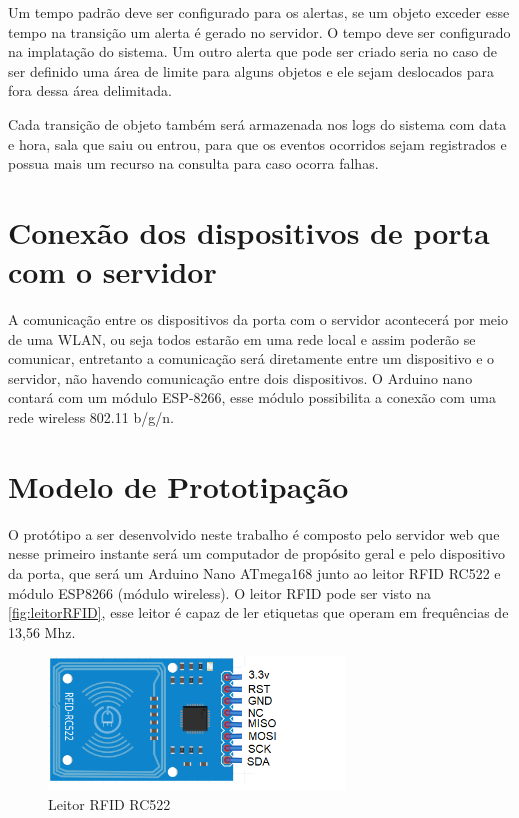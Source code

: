 \par
Um tempo padrão deve ser configurado para os alertas, se um objeto exceder esse tempo na transição um alerta é gerado no servidor. 
O tempo deve ser configurado na implatação do sistema. Um outro alerta que pode ser criado seria no caso de ser definido uma área de limite para alguns objetos e ele sejam deslocados para fora dessa área delimitada.
\par
Cada transição de objeto também será armazenada nos logs do sistema com data e hora, sala que saiu ou entrou, para que os eventos ocorridos sejam registrados e possua mais um recurso na consulta para caso ocorra falhas.


\section{Conexão dos dispositivos de porta com o servidor}
A comunicação entre os dispositivos da porta com o servidor acontecerá por meio de uma WLAN, ou seja todos estarão em uma rede 
local e assim poderão se comunicar, entretanto a comunicação será diretamente entre um dispositivo e o servidor, 
não havendo comunicação entre dois dispositivos. O Arduino nano contará com um módulo ESP-8266, esse módulo possibilita a 
conexão com uma rede wireless 802.11 b/g/n.


\section{Modelo de Prototipação}

O protótipo a ser desenvolvido neste trabalho é composto pelo servidor web que nesse primeiro instante será um computador de 
propósito geral e pelo dispositivo da porta, que será um Arduino Nano ATmega168 junto ao leitor RFID RC522 e módulo ESP8266 (módulo wireless). 
O leitor RFID pode ser visto na \autoref{fig:leitorRFID}, esse leitor é capaz de ler etiquetas que operam em 
frequências de 13,56 Mhz.
\begin{figure}[H]
              \caption{\label{fig:leitorRFID}{Leitor RFID RC522}}
              \centering
              \includegraphics[width=0.7\textwidth]{Figuras/rfid_rc522.PNG}
\end{figure}

